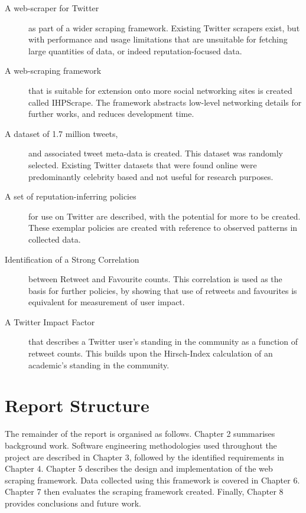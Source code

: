 \begin{description}
	\item [A web-scraper for Twitter] as part of a wider scraping framework. Existing Twitter scrapers exist, but with performance and usage limitations that are unsuitable for fetching large quantities of data, or indeed reputation-focused data.
	
	\item [A web-scraping framework] that is suitable for extension onto more social networking sites is created called IHPScrape. The framework abstracts low-level networking details for further works, and reduces development time.
	
	\item [A dataset of 1.7 million tweets,] and associated tweet meta-data is created. This dataset was randomly selected. Existing Twitter datasets that were found online were predominantly celebrity based and not useful for research purposes. 
	
	\item [A set of reputation-inferring policies] for use on Twitter are described, with the potential for more to be created. These exemplar policies are created with reference to observed patterns in collected data.
	
	\item[Identification of a Strong Correlation] between Retweet and Favourite counts. This correlation is used as the basis for further policies, by showing that use of retweets and favourites is equivalent for measurement of user impact.
	
	\item [A Twitter Impact Factor] that describes a Twitter user's standing in the community as a function of retweet counts. This builds upon the Hirsch-Index \cite{hirsch2005index} calculation of an academic's standing in the community.
	
		
\end{description}

\section{Report Structure}

The remainder of the report is organised as follows. Chapter 2 summarises background work. Software engineering methodologies used throughout the project are described in Chapter 3, followed by the identified requirements in Chapter 4. Chapter 5 describes the design and implementation of the web scraping framework. Data collected using this framework is covered in Chapter 6. Chapter 7 then evaluates the scraping framework created. Finally, Chapter 8 provides conclusions and future work.

